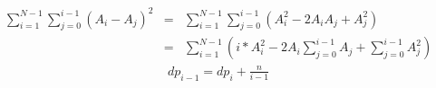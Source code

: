 \documentclass[dvipdfmx]{jsarticle}
\begin{document}
\begin{eqnarray*}
  \sum_{i=1}^{N-1} \sum_{j=0}^{i-1} (A_i-A_j)^2
  &=& \sum_{i=1}^{N-1} \sum_{j=0}^{i-1} (A_i^2 -2A_iA_j + A_j^2)\\
  &=& \sum_{i=1}^{N-1} (i*A_i^2 - 2A_i\sum_{j=0}^{i-1} A_j + \sum_{j=0}^{i-1} A_j^2)
\end{eqnarray*}
\begin{eqnarray*}
  dp_{i-1} = dp_i + \frac{n}{i-1}
\end{eqnarray*}
\end{document}
